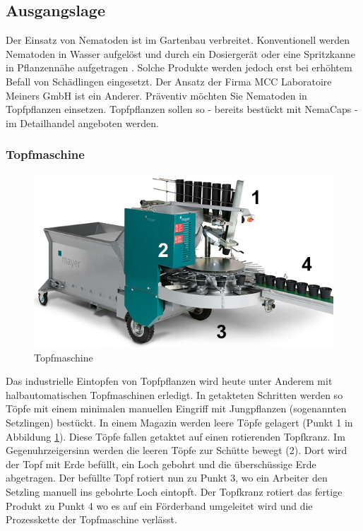 
\subsection{Ausgangslage}
Der Einsatz von Nematoden ist im Gartenbau verbreitet. Konventionell werden Nematoden in Wasser aufgelöst und durch ein Dosiergerät oder eine Spritzkanne in Pflanzennähe aufgetragen \cite{birchmeier}. Solche Produkte werden jedoch erst bei erhöhtem Befall von Schädlingen eingesetzt. Der Ansatz der Firma MCC Laboratoire Meiners GmbH ist ein Anderer. Präventiv möchten Sie Nematoden in Topfpflanzen einsetzen. Topfpflanzen sollen so - bereits bestückt mit NemaCaps - im Detailhandel angeboten werden. 
\subsubsection{Topfmaschine}
\begin{figure}
	\includegraphics[scale=0.5]{Illustrationen/3-Einleitung/schema_topfmaschine.jpg}
	\caption{Topfmaschine}
	\label{fig:schema_topfmaschine}
\end{figure}
Das industrielle Eintopfen von Topfpflanzen wird heute unter Anderem mit halbautomatischen Topfmaschinen erledigt. In getakteten Schritten werden so Töpfe mit einem minimalen manuellen Eingriff mit Jungpflanzen (sogenannten Setzlingen) bestückt. In einem Magazin werden leere Töpfe gelagert (Punkt 1 in Abbildung \ref{fig:schema_topfmaschine}). Diese Töpfe fallen getaktet auf einen rotierenden Topfkranz. Im Gegenuhrzeigersinn werden die leeren Töpfe zur Schütte bewegt (2). Dort wird der Topf mit Erde befüllt, ein Loch gebohrt und die überschüssige Erde abgetragen. Der befüllte Topf rotiert nun zu Punkt 3, wo ein Arbeiter den Setzling manuell ins gebohrte Loch eintopft. Der Topfkranz rotiert das fertige Produkt zu Punkt 4 wo es auf ein Förderband umgeleitet wird und die Prozesskette der Topfmaschine verlässt.

